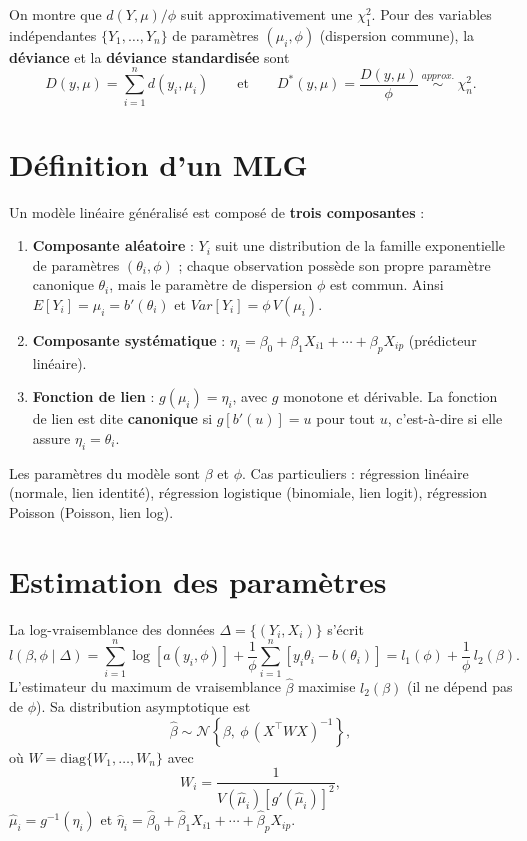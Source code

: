 \documentclass[
  french,
  letterpaper,
  DIV=11,
  numbers=noendperiod]{scrreprt}
\begin{document}
On montre que \(d(Y,\mu)/\phi\) suit approximativement une \(\chi^2_1\).
Pour des variables indépendantes \(\{Y_1,\ldots,Y_n\}\) de paramètres
\((\mu_i,\phi)\) (dispersion commune), la \textbf{déviance} et la
\textbf{déviance standardisée} sont
\[D(y,\mu) = \sum_{i=1}^n d(y_i,\mu_i) \qquad\mbox{et}\qquad D^*(y,\mu) = \frac{D(y,\mu)}{\phi} \ \stackrel{approx.}{\sim}\ \chi^2_n.\]

\section{Définition d'un MLG}\label{duxe9finition-dun-mlg}

Un modèle linéaire généralisé est composé de \textbf{trois composantes}
:

\begin{enumerate}
\def\labelenumi{\arabic{enumi}.}
\item
  \textbf{Composante aléatoire} : \(Y_i\) suit une distribution de la
  famille exponentielle de paramètres \((\theta_i, \phi)\) ; chaque
  observation possède son propre paramètre canonique \(\theta_i\), mais
  le paramètre de dispersion \(\phi\) est commun. Ainsi
  \(E[Y_i] = \mu_i = b'(\theta_i)\) et \(Var[Y_i] = \phi\, V(\mu_i)\).
\item
  \textbf{Composante systématique} :
  \(\eta_i = \beta_0 + \beta_1 X_{i1} + \cdots + \beta_p X_{ip}\)
  (prédicteur linéaire).
\item
  \textbf{Fonction de lien} : \(g(\mu_i) = \eta_i\), avec \(g\) monotone
  et dérivable. La fonction de lien est dite \textbf{canonique} si
  \(g[b'(u)] = u\) pour tout \(u\), c'est-à-dire si elle assure
  \(\eta_i = \theta_i\).
\end{enumerate}

Les paramètres du modèle sont \(\beta\) et \(\phi\). Cas particuliers :
régression linéaire (normale, lien identité), régression logistique
(binomiale, lien logit), régression Poisson (Poisson, lien log).

\section{Estimation des paramètres}\label{estimation-des-paramuxe8tres}

La log-vraisemblance des données \(\Delta = \{(Y_i,X_i)\}\) s'écrit
\[l(\beta,\phi\mid\Delta) = \sum_{i=1}^n\log[a(y_i,\phi)] + \frac{1}{\phi}\sum_{i=1}^n[y_i\theta_i - b(\theta_i)] = l_1(\phi) + \frac{1}{\phi}\, l_2(\beta).\]
L'estimateur du maximum de vraisemblance \(\hat\beta\) maximise
\(l_2(\beta)\) (il ne dépend pas de \(\phi\)). Sa distribution
asymptotique est
\[\hat\beta \sim \mathcal{N}\left\{\beta,\ \phi\,(X^\top W X)^{-1}\right\},\]
où \(W = \mathrm{diag}\{W_1,\ldots,W_n\}\) avec
\[W_i = \frac{1}{V(\hat\mu_i)\left[g'(\hat\mu_i)\right]^2},\]
\(\hat\mu_i = g^{-1}(\hat\eta_i)\) et
\(\hat\eta_i = \hat\beta_0 + \hat\beta_1 X_{i1} + \cdots + \hat\beta_p X_{ip}\).
\end{document}
